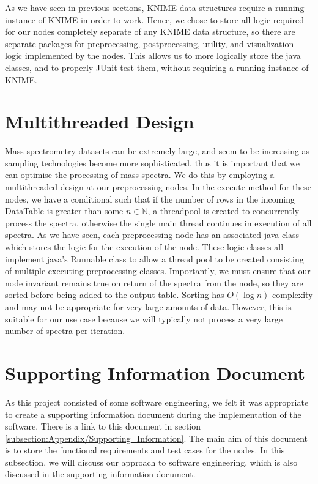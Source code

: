 \documentclass[11pt,openany]{book}
\begin{document}
As we have seen in previous sections, KNIME data structures require a running instance of KNIME in order to work. Hence, we chose to store all logic required for our nodes completely separate of any KNIME data structure, so there are separate packages for preprocessing, postprocessing, utility, and visualization logic implemented by the nodes. This allows us to more logically store the java classes, and to properly JUnit test them, without requiring a running instance of KNIME. 

\section{Multithreaded Design}
Mass spectrometry datasets can be extremely large, and seem to be increasing as sampling technologies become more sophisticated, thus it is important that we can optimise the processing of mass spectra. We do this by employing a multithreaded design at our preprocessing nodes. In the execute method for these nodes, we have a conditional such that if the number of rows in the incoming DataTable is greater than some $n \in \mathbb{N}$, a threadpool is created to concurrently process the spectra, otherwise the single main thread continues in execution of all spectra. As we have seen, each preprocessing node has an associated java class which stores the logic for the execution of the node. These logic classes all implement java's Runnable class to allow a thread pool to be created consisting of multiple executing preprocessing classes. Importantly, we must ensure that our node invariant remains true on return of the spectra from the node, so they are sorted before being added to the output table. Sorting has $O(\log n )$ complexity and may not be appropriate for very large amounts of data. However, this is suitable for our use case because we will typically not process a very large number of spectra per iteration.

\section{Supporting Information Document}
As this project consisted of some software engineering, we felt it was appropriate to create a supporting information document during the implementation of the software. There is a link to this document in section \ref{subsection:Appendix/Supporting_Information}. The main aim of this document is to store the functional requirements and test cases for the nodes. In this subsection, we will discuss our approach to software engineering, which is also discussed in the supporting information document.
\end{document}
